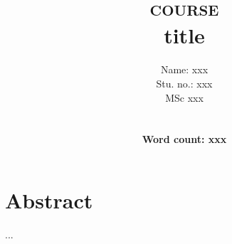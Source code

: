 \documentclass[a4paper, 12pt, epic, carom]{article}
\title{\textsc{course} \\ $ $\\
title}
\author{Name: xxx \\
Stu. no.: xxx \\
MSc xxx
\\ $ $\\
\\ $ $\\
\\ $ $\\
\textbf{Word count: xxx}}
\begin{document}
\fancyfoot{}
\fancyfoot[LO]{}
\fancyfoot[CO]{}
\fancyfoot[CE]{}
\fancyfoot[RO]{\thepage}


\fancyhead{}
\renewcommand{\headrulewidth}{1pt} 
\renewcommand{\footrulewidth}{1pt}



\maketitle

\newpage

% 
%
\section*{Abstract}
...








\newpage
\tableofcontents
\newpage






\end{document}
